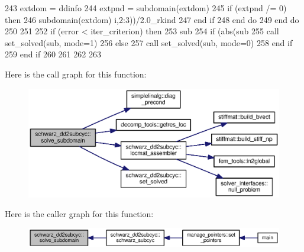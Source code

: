 \begin{DoxyCode}
243             extdom = ddinfo%
244             extpnd = subdomain(extdom)%
245             \textcolor{keywordflow}{if} (extpnd /= 0) \textcolor{keywordflow}{then}
246               subdomain(extdom)%
      i,2:3))/2.0\_rkind
247 \textcolor{keywordflow}{            end if}
248 \textcolor{keywordflow}{          end do}
249 \textcolor{keywordflow}{        end do}
250         
251         
252         \textcolor{keywordflow}{if} (error < iter_criterion) \textcolor{keywordflow}{then}
253           sub%
254           \textcolor{keywordflow}{if} (abs(sub%
255             \textcolor{keyword}{call }set_solved(sub, mode=1)
256           \textcolor{keywordflow}{else}
257             \textcolor{keyword}{call }set_solved(sub, mode=0)
258 \textcolor{keywordflow}{          end if}
259 \textcolor{keywordflow}{        end if}
260         
261 
262         
263       
\end{DoxyCode}


Here is the call graph for this function\+:\nopagebreak
\begin{figure}[H]
\begin{center}
\leavevmode
\includegraphics[width=350pt]{namespaceschwarz__dd2subcyc_a332b28ddec42b6b80a856199f23d4355_cgraph}
\end{center}
\end{figure}




Here is the caller graph for this function\+:\nopagebreak
\begin{figure}[H]
\begin{center}
\leavevmode
\includegraphics[width=350pt]{namespaceschwarz__dd2subcyc_a332b28ddec42b6b80a856199f23d4355_icgraph}
\end{center}
\end{figure}





